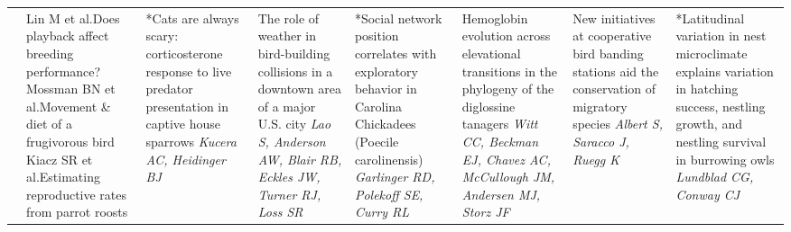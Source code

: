 \begin{tabular}{|x{0.85cm}|x{2.85cm}|x{2.85cm}|x{2.85cm}|x{2.85cm}|x{2.85cm}|a{2.85cm}|a{2.85cm}|}
&Lin M  et al.\newline \tiny Does playback affect breeding performance?  \scriptsize\newline \newline Mossman BN  et al.\newline \tiny Movement \& diet of a frugivorous bird  \scriptsize\newline \newline Kiacz SR  et al.\newline \tiny Estimating reproductive rates from parrot roosts  \scriptsize & *Cats are always scary: corticosterone response to live predator presentation in captive house sparrows \newline \newline \textit{Kucera AC, Heidinger BJ} & The role of weather in bird-building collisions in a downtown area of a major U.S. city \newline \newline \textit{Lao S, Anderson AW, Blair RB, Eckles JW, Turner RJ, Loss SR} & *Social network position correlates with exploratory behavior in Carolina Chickadees (Poecile carolinensis) \newline \newline \textit{Garlinger RD, Polekoff SE, Curry RL} & Hemoglobin evolution across elevational transitions in the phylogeny of the diglossine tanagers \newline \newline \textit{Witt CC, Beckman EJ, Chavez AC, McCullough JM, Andersen MJ, Storz JF} & New initiatives at cooperative bird banding stations aid the conservation of migratory species \newline \newline \textit{Albert S, Saracco J, Ruegg K} & *Latitudinal variation in nest microclimate explains variation in hatching success, nestling growth, and nestling survival in burrowing owls \newline \newline \textit{Lundblad CG, Conway CJ}\\

\end{tabular}
